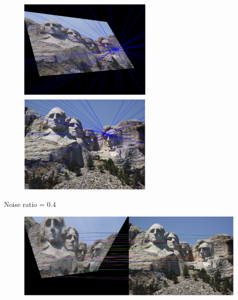 \documentclass[11pt]{article}
\begin{document}
\begin{figure}[H]
    \centering
    \includegraphics[width=6.5cm]{images/part3/no_ransac_image_1_noise_0.3_left.png}
    \includegraphics[width=6.5cm]{images/part3/no_ransac_image_1_noise_0.3_right.png}
\end{figure}

Noise ratio = 0.4
\begin{figure}[H]
    \centering
    \includegraphics[width=14cm]{images/part3/no_ransac_image_1_noise_0.4_1.png}
\end{figure}
\end{document}
